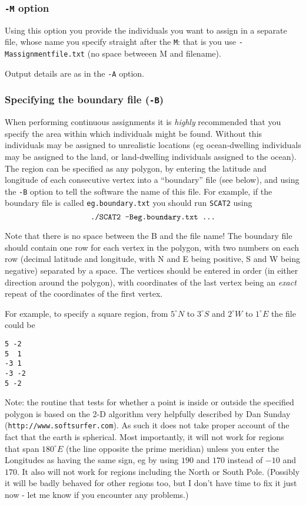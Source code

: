 \documentclass[11pt,titlepage,times,letterpaper]{article}
\def\SCAT{{\tt SCAT2} }
\begin{document}
\subsubsection{{\tt -M} option} \label{assign2}

Using this option you provide the individuals you want to assign in a separate file, whose
name you specify straight after the {\tt M}: that is you use 
 {\tt -Massignmentfile.txt} (no space betweeen M and filename). 
 
 Output details are as in the {\tt -A} option.
 
\subsubsection{Specifying the boundary file ({\tt -B})} \label{boundary}

When performing continuous assignments it is {\it highly}
recommended that you specify the area within which individuals might
be found. Without this individuals may be assigned to unrealistic
locations (eg ocean-dwelling individuals may be assigned to the land,
or land-dwelling individuals assigned to the ocean). The region can be
specified as any polygon, by entering the latitude and longitude of
each consecutive vertex into a ``boundary'' file (see below), and using
the {\tt -B} option to tell the software the name of this file.
For example, if the boundary file is called {\tt eg.boundary.txt} you
should run \SCAT using
$$\text{\tt ./SCAT2 -Beg.boundary.txt ...}$$ 

Note that there is no space between the B and the file name!
The boundary file should contain one row for each vertex in the
polygon, with two numbers on each row (decimal latitude and longitude,
with N and E being positive, S and W being negative) separated by a
space. The vertices should be entered in order (in either direction
around the polygon), with coordinates of the last vertex being an {\it
exact} repeat of the coordinates of the first vertex.

For example, to specify a square region, from $5^\circ N$ to $3^\circ S$ and
$2^\circ W$ to $1^\circ E$ the file could be
\begin{verbatim}
5 -2
5  1
-3 1
-3 -2
5 -2
\end{verbatim}

Note: the routine that tests for whether a point is inside or outside
the specified polygon is based on the 2-D algorithm very helpfully
described by Dan Sunday ({\tt http://www.softsurfer.com}). As such it
does not take proper account of the fact that the earth is
spherical. Most importantly, it will not work for regions that span
$180^\circ E$ (the line opposite the prime meridian) unless you enter
the Longitudes as having the same sign, eg by using $190$ and $170$
instead of $-10$ and $170$. It also will not work for regions
including the North or South Pole.  (Possibly it will be badly behaved
for other regions too, but I don't have time to fix it just now - let
me know if you encounter any problems.)
\end{document}
